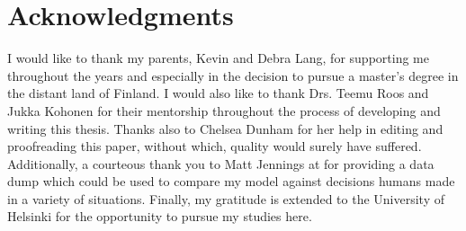 
\section*{Acknowledgments}
\label{sec:thanks}


I would like to thank my parents, Kevin and Debra Lang,
for supporting me
throughout the years and especially in the decision to pursue a master's degree
in the distant land of Finland.
%
I would also like to thank Drs. Teemu Roos
and Jukka Kohonen
for %
their mentorship throughout the
process of developing and writing this thesis.
%
Thanks also to Chelsea Dunham for her help in editing and proofreading
this paper,
without which,
quality would surely have suffered.
%
Additionally,
a courteous thank you to Matt Jennings at
 for providing a data dump
which could be used to compare my model against decisions humans made
in a variety of situations.
%
Finally, my gratitude is extended to the University of Helsinki for the
opportunity to pursue my studies here.


\newpage
